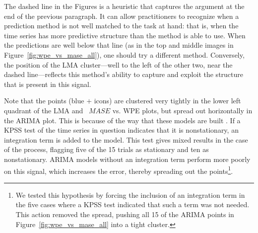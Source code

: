 The dashed line in the Figures is a heuristic that captures the
argument at the end of the previous paragraph.  It can allow
practitioners to recognize when a prediction method is not well
matched to the task at hand: that is, when the time series has more
predictive structure than the method is able to use.  When the
predictions are well below that line (as in the top and middle images
in Figure~\ref{fig:wpe_vs_mase_all}), one should try a different
method.  Conversely, the position of the LMA cluster---well to the
left of the other two, near the dashed line---reflects this method's
ability to capture and exploit the structure that is present in this
signal.

Note that the \col points (blue {\color{blue}$+$} icons) are clustered
very tightly in the lower left quadrant of the LMA and \naive ~$MASE$
vs. WPE plots, but spread out horizontally in the ARIMA plot.  This is
because of the way that these models are built \cite{autoARIMA}.  If
a KPSS test of the time series in question indicates that it is
nonstationary, an integration term is added to the model.  This test
gives mixed results in the case of the \col process, flagging five of
the 15 trials as stationary and ten as nonstationary.  ARIMA models
without an integration term perform more poorly on this signal, which
increases the error, thereby spreading out the points\footnote{We
  tested this hypothesis by forcing the inclusion of an integration
  term in the five cases where a KPSS test indicated that such a term
  was not needed.  This action removed the spread, pushing all 15 of
  the \col ARIMA points in Figure~\ref{fig:wpe_vs_mase_all} into a
  tight cluster.}.

